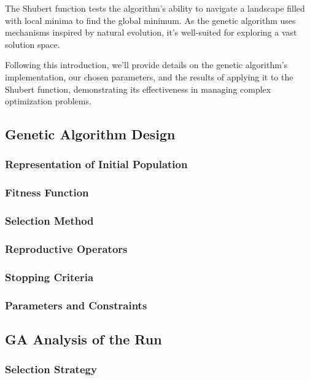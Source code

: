 \documentclass[conference]{inc/IEEEtran}
\begin{document}
The Shubert function tests the algorithm's ability to navigate a landscape filled with local minima to find the global minimum. As the genetic algorithm
uses mechanisms inspired by natural evolution, it's well-suited for exploring a vast solution space.

Following this introduction, we'll provide details on the genetic algorithm's implementation, our chosen parameters, and the results of applying it to the
Shubert function, demonstrating its effectiveness in managing complex optimization problems.

\subsection{Genetic Algorithm Design}

\subsubsection{Representation of Initial Population}

\subsubsection{Fitness Function}

\subsubsection{Selection Method}

\subsubsection{Reproductive Operators}

\subsubsection{Stopping Criteria}

\subsubsection{Parameters and Constraints}
\subsection{GA Analysis of the Run}

\subsubsection{Selection Strategy}
\end{document}
